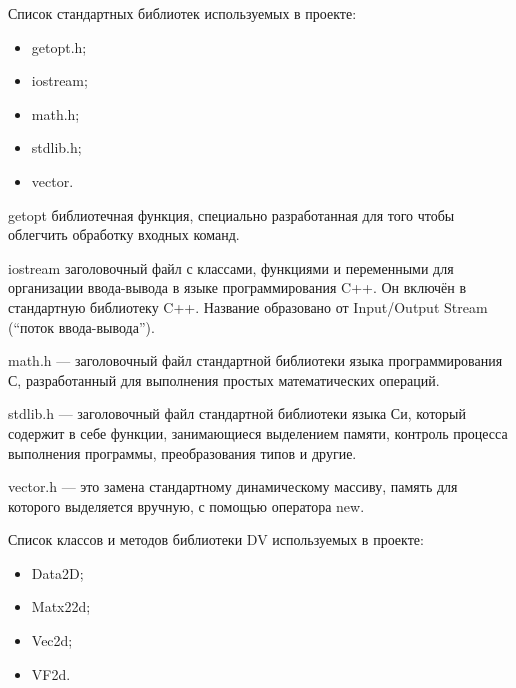 Список стандартных библиотек используемых в проекте:

\begin{itemize}
\item getopt.h;
\item iostream;
\item math.h;
\item stdlib.h;
\item vector.
\end{itemize}

getopt библиотечная функция, специально разработанная для того чтобы облегчить обработку входных команд. 

iostream заголовочный файл с классами, функциями и переменными для организации ввода-вывода в языке программирования C++. Он включён в стандартную библиотеку C++. Название образовано от Input/Output Stream (``поток ввода-вывода'').

math.h — заголовочный файл стандартной библиотеки языка программирования С, разработанный для выполнения простых математических операций.

stdlib.h — заголовочный файл стандартной библиотеки языка Си, который содержит в себе функции, занимающиеся выделением памяти, контроль процесса выполнения программы, преобразования типов и другие.

vector.h — это замена стандартному динамическому массиву, память для которого выделяется вручную, с помощью оператора new.

Список классов и методов библиотеки DV используемых в проекте:
\begin{itemize}
\item Data2D;
\item Matx22d;
\item Vec2d;
\item VF2d.
\end{itemize}